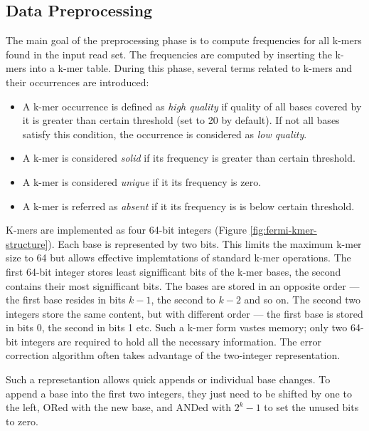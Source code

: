 \subsection{Data Preprocessing}
\label{subsec:fermi-data-preprocessing}

The main goal of the preprocessing phase is to compute frequencies for all k-mers found in the input read set. The frequencies are computed by inserting the k-mers into a k-mer table. During this phase, several terms related to k-mers and their occurrences are introduced:
\begin{itemize}
\item A k-mer occurrence is defined as \textit{high quality} if quality of all bases covered by it is greater than certain threshold (set to 20 by default). If not all bases satisfy this condition, the occurrence is considered as \textit{low quality}.
\item A k-mer is considered \textit{solid} if its frequency is greater than certain threshold.
\item A k-mer is considered \textit{unique} if it its frequency is zero.
\item A k-mer is referred as \textit{absent} if it its frequency is is below certain threshold.
\end{itemize}
K-mers are implemented as four 64-bit integers (Figure \ref{fig:fermi-kmer-structure}). Each base is represented by two bits. This limits the maximum k-mer size to 64 but allows effective implemtations of standard k-mer operations. The first 64-bit integer stores least signifficant bits of the k-mer bases, the second contains their most signifficant bits. The bases are stored in an opposite order --- the first base resides in bits $k-1$, the second to $k-2$ and so on. The second two integers store the same content, but with different order --- the first base is stored in bits 0, the second in bits 1 etc. Such a k-mer form vastes memory; only two 64-bit integers are required to hold all the necessary information. The error correction algorithm often takes advantage of the two-integer representation.

Such a represetantion allows quick appends or individual base changes. To append a base into the first two integers, they just need to be shifted by one to the left, ORed with the new base, and ANDed with $2^k-1$ to set the unused bits to zero.

